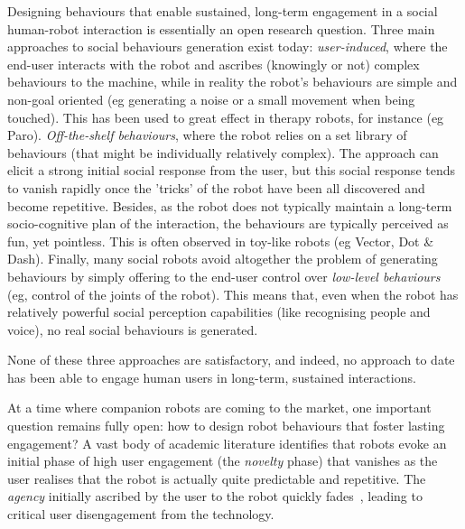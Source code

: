 \documentclass[11pt,a4paper]{report}
\newcommand{\project}{WizUs\xspace}
\begin{document}
%

Designing behaviours that
enable sustained, long-term engagement in a social human-robot interaction is
essentially an open research question. Three main approaches to social
behaviours generation exist today: \emph{user-induced}, where the end-user
interacts with the robot and ascribes (knowingly or not) complex behaviours to
the machine, while in reality the robot's behaviours are simple and non-goal
oriented (eg generating a noise or a small movement when being touched). This
has been used to great effect in therapy robots, for instance (eg Paro).
\emph{Off-the-shelf behaviours}, where the robot relies on a set library of
behaviours (that might be individually relatively complex). The approach can
elicit a strong initial social response from the user, but this social response
tends to vanish rapidly once the 'tricks' of the robot have been all discovered
and become repetitive.  Besides, as the robot does not typically maintain a
long-term socio-cognitive plan of the interaction, the behaviours are typically
perceived as fun, yet pointless. This is often observed in toy-like robots (eg
Vector, Dot \& Dash). Finally, many social robots avoid altogether the problem
of generating behaviours by simply offering to the end-user control over
\emph{low-level behaviours} (eg, control of the joints of the robot). This means
that, even when the robot has relatively powerful social perception capabilities
(like recognising people and voice), no real social behaviours is generated.

None of these three approaches are satisfactory, and indeed, no approach to date
has been able to engage human users in long-term, sustained interactions.




At a time where companion robots are coming to the market, one important
question remains fully open: how to design robot behaviours that foster
lasting engagement? A vast body of academic literature identifies that
robots evoke an initial phase of high user engagement (the
\emph{novelty} phase) that vanishes as the user realises that the robot
is actually quite predictable and repetitive. The \emph{agency}
initially ascribed by the user to the robot quickly
fades~\cite{lemaignan2014dynamics}, leading to critical user disengagement from the technology.
\end{document}
